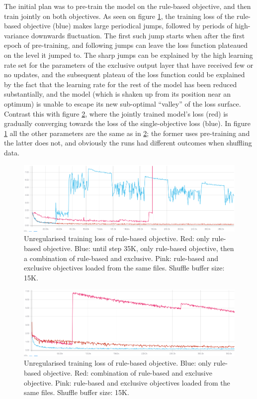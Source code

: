 The initial plan was to pre-train the model on the rule-based objective, and then train jointly on both objectives.
As seen on figure \ref{pretrain}, the training loss of the rule-based objective (blue) makes large periodical jumps, followed by periods of high-variance downwards fluctuation.
The first such jump starts when after the first epoch of pre-training, and following jumps can leave the loss function plateaued on the level it jumped to.
The sharp jumps can be explained by the high learning rate set for the parameters of the exclusive output layer that have received few or no updates, and the subsequent plateau of the loss function could be explained by the fact that the learning rate for the rest of the model has been reduced substantially, and the model (which is shaken up from its position near an optimum) is unable to escape its new sub-optimal ``valley'' of the loss surface.
Contrast this with figure \ref{nopretrain}, where the jointly trained model's loss (red) is gradually converging towards the loss of the single-objective loss (blue).
In figure \ref{pretrain} all the other parameters are the same as in \ref{nopretrain}; the former uses pre-training and the latter does not, and obviously the runs had different outcomes when shuffling data.

\begin{figure}
  \includegraphics[width=\linewidth]{figures/multiobj/pretrain}
  \caption{Unregularised training loss of rule-based objective. Red: only rule-based objective. Blue: until step 35K, only rule-based objective, then a combination of rule-based and exclusive. Pink: rule-based and exclusive objectives loaded from the same files. Shuffle buffer size: 15K.}
  \label{pretrain}
\end{figure}

\begin{figure}
  \includegraphics[width=\linewidth]{figures/multiobj/nopretrain}
  \caption{Unregularised training loss of rule-based objective. Blue: only rule-based objective. Red: combination of rule-based and exclusive objective. Pink: rule-based and exclusive objectives loaded from the same files. Shuffle buffer size: 15K.}
  \label{nopretrain}
\end{figure}

